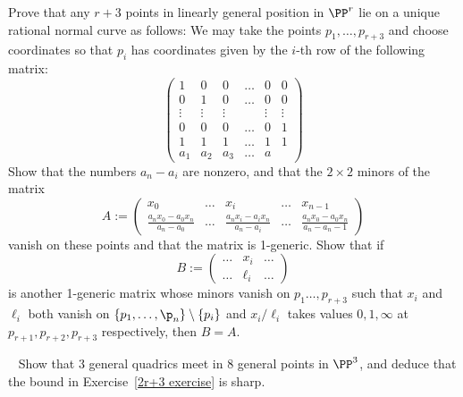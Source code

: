 \begin{exercise}\label{r+3 exercise}
Prove that any $r+3$ points in linearly general position in $\PP^r$ lie on a unique rational normal curve as follows:
 We may take the points $p_1,\dots,p_{r+3}$ and choose coordinates so that $p_i$ has coordinates given by the $i$-th row of the following matrix:
$$
\begin{pmatrix}
 1&0&0&\dots&0&0\\
 0&1&0&\dots&0&0\\
 \vdots &\vdots&\vdots&&\vdots&\vdots \\
 0&0&0&\dots&0&1\\
 1&1&1&\dots&1&1\\
 a_1&a_2&a_3&\dots&a
 \end{pmatrix}
$$
Show that the numbers $a_n-a_i$ are nonzero, and that the $2\times 2$ minors of the matrix
$$
A := \begin{pmatrix}
 x_0&\dots&x_i&\dots& x_{n-1}\\
\frac{a_nx_0-a_0x_n}{a_n-a_0}&\dots&\frac{a_nx_i-a_ix_n}{a_n-a_i}&\dots&\frac{a_nx_0-a_0x_n}{a_n-a_n-1} 
\end{pmatrix}
$$
vanish on these points and that the matrix is 1-generic. Show that if 
$$
B:= \begin{pmatrix}
 \dots& x_i&\dots\\
 \dots& \ell_i &\dots
\end{pmatrix}
$$
is another 1-generic matrix whose minors vanish on $p_1\dots, p_{r+3}$ such that $x_i$ and $\ell_i$ both vanish on
$\{p_1,\dots, \p_n\} \setminus \{p_i\}$ and
$x_i/\ell_i$ takes values $0,1,\infty$ at $p_{r+1},p_{r+2},p_{r+3}$ respectively, then $B= A$.
\end{exercise}


\begin{exercise}~\label{2r+3 is sharp}
Show that 3 general quadrics meet in 8 general points in $\PP^3$, and deduce that the bound in Exercise~\ref{2r+3 exercise}
is sharp.
\end{exercise}



